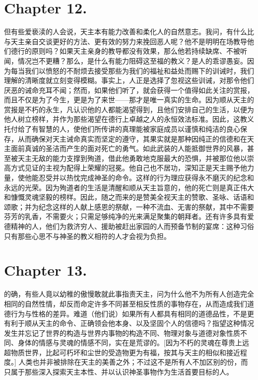\section{Chapter 12. }

但有些爱亵渎的人会说，天主本有能力改善和柔化人的自然意志。我问，有什么比与天主亲自交谈更好的方法、更有效的努力来挽回恶人呢？他不是明明在场教导他们德行的原则吗？如果天主亲身的教导都没有效果，那么他若持续缺席、不被听闻，情况岂不更糟？那么，是什么有能力阻碍这至福的教义？是人的乖谬愚妄。因为每当我们以愤怒的不耐烦去接受那些为我们的福祉和益处而赐下的训诫时，我们理解的清晰度就立刻变得模糊。事实上，人正是选择了忽视这些训诫，对那令他们厌恶的诫命充耳不闻；然而，如果他们听了，就会获得一个值得如此关注的赏报，而且不仅是为了今生，更是为了来世——那才是唯一真实的生命。因为顺从天主的赏报是不朽的永生，凡认识他的人都能渴望得到，且他们安排自己的生活，以便为他人树立榜样，并作为那些渴望在德行上卓越之人的永恒效法标准。因此，这教义托付给了有智慧的人，使他们所传讲的真理能被家庭成员以谨慎和纯洁的良心保存，从而确保对天主诫命真实而坚定的遵守，其果实就是那种因纯正的信德和在天主面前真诚的圣洁而产生的面对死亡的勇气。如此武装的人能抵御世界的风暴，甚至被天主无敌的能力支撑到殉道，借此他勇敢地克服最大的恐惧，并被那位他以崇高方式见证的主视为配得上荣耀的冠冕。他自己也不居功，深知正是天主赐予他力量，使他能忍受并以热忱完成神圣的命令。这样的行为理应获得永不磨灭的纪念和永远的光荣。因为殉道者的生活是清醒和顺从天主旨意的，他的死亡则是真正伟大和慷慨灵魂坚毅的榜样。因此，随之而来的是赞美全视天主的赞歌、圣咏、话语和颂歌；并为纪念这样的人献上感恩的祭献，一种不流血、无害的祭献，其中不需要芬芳的乳香，不需要火；只需足够纯净的光来满足聚集的朝拜者。还有许多具有爱德精神的人，他们为救济穷人、援助被赶出家园的人而预备节制的宴席：这种习俗只有那些心思不与神圣的教义相符的人才会视为负担。\par


\section{Chapter 13. }

的确，有些人竟以幼稚的傲慢敢就此事指责天主，问为什么他不为所有人创造完全相同的自然性情，却反而命定许多不同甚至相反性质的事物存在，从而造成我们道德行为与性格的差异。难道（他们说）如果所有人都具有相同的道德品性，不是更有利于顺从天主的命令、正确领会他本身、以及坚固个人的信德吗？指望这种情况发生并忘记了世界的构造与世界内事物的构造不同、物理对象与道德对象性质不同、身体的情感与灵魂的情感不同，实在是荒谬的。[因为不朽的灵魂在尊贵上远超物质世界，比起可朽坏和尘世的受造物更为有福，按其与天主的相似和接近程度。] 人类也并非被排除在天主的美善之外；不过这不是所有人不加区别的份，而只属于那些深入探索天主本性、并以认识神圣事物作为生活首要目标的人。\par

